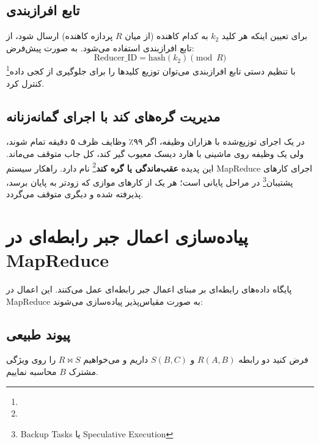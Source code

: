 \subsection{تابع افرازبندی \texorpdfstring{}{(Partitioner)}}
برای تعیین اینکه هر کلید $k_2$ به کدام کاهنده (از میان $R$ پردازه کاهنده) ارسال شود، از تابع افرازبندی استفاده می‌شود. به صورت پیش‌فرض:
\begin{equation}
\text{Reducer\_ID} = \text{hash}(k_2) \pmod R
\end{equation}
با تنظیم دستی تابع افرازبندی می‌توان توزیع کلیدها را برای جلوگیری از کجی داده\footnote{} کنترل کرد.

\subsection{مدیریت گره‌های کند \texorpdfstring{}{(Stragglers)} با اجرای گمانه‌زنانه}
در یک اجرای توزیع‌شده با هزاران وظیفه، اگر ۹۹٪ وظایف ظرف ۵ دقیقه تمام شوند، ولی یک وظیفه روی ماشینی با هارد دیسک معیوب گیر کند، کل جاب متوقف می‌ماند. این پدیده \textbf{عقب‌ماندگی یا گره کند}\footnote{} نام دارد.
راهکار سیستم MapReduce اجرای کارهای پشتیبان\footnote{Backup Tasks یا Speculative Execution} در مراحل پایانی است؛ هر یک از کارهای موازی که زودتر به پایان برسد، پذیرفته شده و دیگری متوقف می‌گردد.

\section{پیاده‌سازی اعمال جبر رابطه‌ای در MapReduce}
پایگاه داده‌های رابطه‌ای بر مبنای اعمال جبر رابطه‌ای عمل می‌کنند. این اعمال در MapReduce به صورت مقیاس‌پذیر پیاده‌سازی می‌شوند:

\subsection{پیوند طبیعی \texorpdfstring{}{(Natural Join)}}
فرض کنید دو رابطه $R(A, B)$ و $S(B, C)$ داریم و می‌خواهیم $R \bowtie S$ را روی ویژگی مشترک $B$ محاسبه نماییم.

